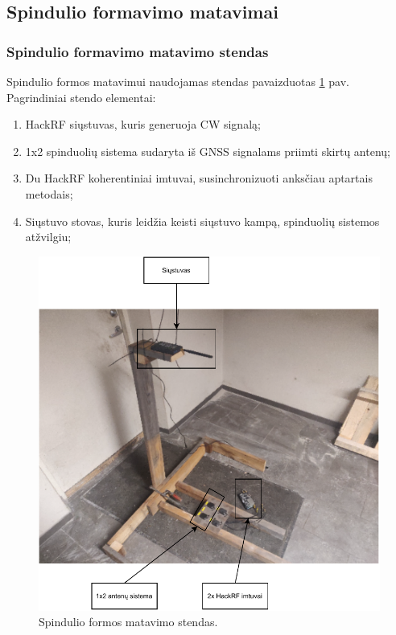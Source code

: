 \documentclass[main.tex]{subfiles}
\begin{document}
\subsection{Spindulio formavimo matavimai}\label{sec:beam_form_results}

\subsubsection{Spindulio formavimo matavimo stendas}

Spindulio formos matavimui naudojamas stendas pavaizduotas \ref{fig:beamform_stand}
pav. Pagrindiniai stendo elementai:

\begin{enumerate}
    \item HackRF siųstuvas, kuris generuoja CW signalą;
    \item 1x2 spinduolių sistema sudaryta iš GNSS signalams priimti skirtų antenų;
    \item Du HackRF koherentiniai imtuvai, susinchronizuoti anksčiau aptartais metodais;
    \item Siųstuvo stovas, kuris leidžia keisti siųstuvo kampą, spinduolių sistemos atžvilgiu;
\end{enumerate}

\begin{figure}[h]
    \begin{centering}
    \includegraphics[scale=1.0]{drawings/beamform_stand.drawio}
    \par\end{centering}
    \protect\caption{\label{fig:beamform_stand}Spindulio formos matavimo stendas.}
\end{figure}
\end{document}
